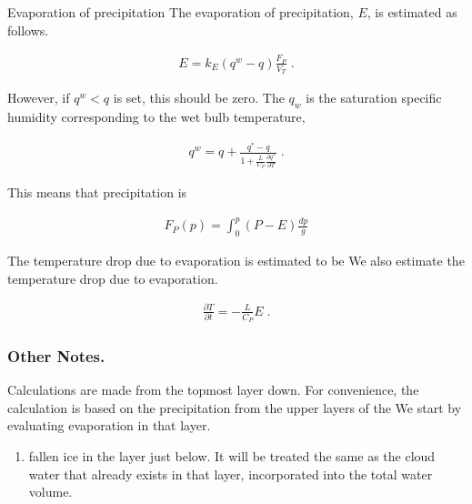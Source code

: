 Evaporation of precipitation The evaporation of precipitation, \(E\), is
estimated as follows.

\begin{eqnarray}
E = k_E (q^w - q) \frac{F_P}{V_T} \; .
\end{eqnarray}

However, if \(q^w < q\) is set, this should be zero. The \(q_w\) is the
saturation specific humidity corresponding to the wet bulb temperature,

\begin{eqnarray}
  q^w = q + \frac{q^* - q}{1+ \frac{L}{C_P}\frac{\partial q^*}{\partial T}} \; .
\end{eqnarray}

This means that precipitation is

\begin{eqnarray}
  F_P(p) = \int_0^p (P - E) \frac{dp}{g}
\end{eqnarray}

The temperature drop due to evaporation is estimated to be We also
estimate the temperature drop due to evaporation.

\begin{eqnarray}
  \frac{\partial T}{\partial t} = - \frac{L}{C_P} E \; .
\end{eqnarray}

\hypertarget{other-notes.}{%
\subsubsection{Other Notes.}\label{other-notes.}}

Calculations are made from the topmost layer down. For convenience, the
calculation is based on the precipitation from the upper layers of the
We start by evaluating evaporation in that layer.

\begin{enumerate}
\def\labelenumi{\arabic{enumi}.}
\setcounter{enumi}{1}
\tightlist
\item
  fallen ice in the layer just below. It will be treated the same as the
  cloud water that already exists in that layer, incorporated into the
  total water volume.
\end{enumerate}
